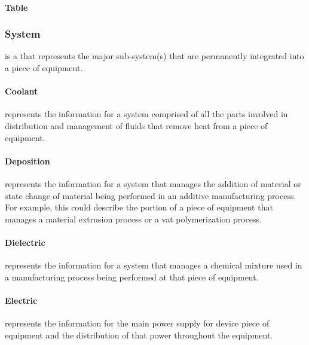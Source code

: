 \paragraph{Table}\mbox{}
\label{sec:Table}





\subsubsection{System}
\label{sec:System}



 is a  that represents the major sub-system(s) that are permanently integrated into a piece of equipment.


\paragraph{Coolant}\mbox{}
\label{sec:Coolant}


 represents the information for a system comprised of all the parts involved in distribution and management of fluids that remove heat from a piece of equipment.


\paragraph{Deposition}\mbox{}
\label{sec:Deposition}


 represents the information for a system that manages the addition of material or state change of material being performed in an additive manufacturing process.  For example, this could describe the portion of a piece of equipment that manages a material extrusion process or a vat polymerization process.


\paragraph{Dielectric}\mbox{}
\label{sec:Dielectric}


 represents the information for a system that manages a chemical mixture used in a manufacturing process being performed at that piece of equipment.


\paragraph{Electric}\mbox{}
\label{sec:Electric}


 represents the information for the main power supply for device piece of equipment and the distribution of that power throughout the equipment.


